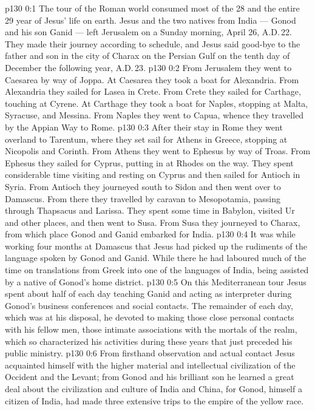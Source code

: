 \author{Midwayer Commission}
\vs p130 0:1 The tour of the Roman world consumed most of the 28 and the entire 29 year of Jesus’ life on earth. Jesus and the two natives from India --- Gonod and his son Ganid --- left Jerusalem on a Sunday morning, April 26, A.D.\,22. They made their journey according to schedule, and Jesus said good\hyp{}bye to the father and son in the city of Charax on the Persian Gulf on the tenth day of December the following year, A.D.\,23.
\vs p130 0:2 \pc From Jerusalem they went to Caesarea by way of Joppa. At Caesarea they took a boat for Alexandria. From Alexandria they sailed for Lasea in Crete. From Crete they sailed for Carthage, touching at Cyrene. At Carthage they took a boat for Naples, stopping at Malta, Syracuse, and Messina. From Naples they went to Capua, whence they travelled by the Appian Way to Rome.
\vs p130 0:3 After their stay in Rome they went overland to Tarentum, where they set sail for Athens in Greece, stopping at Nicopolis and Corinth. From Athens they went to Ephesus by way of Troas. From Ephesus they sailed for Cyprus, putting in at Rhodes on the way. They spent considerable time visiting and resting on Cyprus and then sailed for Antioch in Syria. From Antioch they journeyed south to Sidon and then went over to Damascus. From there they travelled by caravan to Mesopotamia, passing through Thapsacus and Larissa. They spent some time in Babylon, visited Ur and other places, and then went to Susa. From Susa they journeyed to Charax, from which place Gonod and Ganid embarked for India.
\vs p130 0:4 \pc It was while working four months at Damascus that Jesus had picked up the rudiments of the language spoken by Gonod and Ganid. While there he had laboured much of the time on translations from Greek into one of the languages of India, being assisted by a native of Gonod’s home district.
\vs p130 0:5 \pc On this Mediterranean tour Jesus spent about half of each day teaching Ganid and acting as interpreter during Gonod’s business conferences and social contacts. The remainder of each day, which was at his disposal, he devoted to making those close personal contacts with his fellow men, those intimate associations with the mortals of the realm, which so characterized his activities during these years that just preceded his public ministry.
\vs p130 0:6 From firsthand observation and actual contact Jesus acquainted himself with the higher material and intellectual civilization of the Occident and the Levant; from Gonod and his brilliant son he learned a great deal about the civilization and culture of India and China, for Gonod, himself a citizen of India, had made three extensive trips to the empire of the yellow race.
